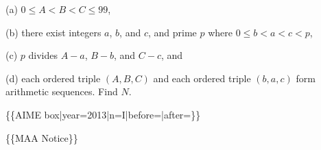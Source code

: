 \documentclass{article}
\begin{document}
\begin{enumerate}[label=\arabic*., itemsep=0.5em]
(a) \(0\le A<B<C\le99\), 

(b) there exist integers \(a\), \(b\), and \(c\), and prime \(p\) where \(0\le b<a<c<p\), 

(c) \(p\) divides \(A-a\), \(B-b\), and \(C-c\), and 

(d) each ordered triple \((A,B,C)\) and each ordered triple \((b,a,c)\) form arithmetic sequences. Find \(N\).



\{\{AIME box|year=2013|n=I|before=|after=\}\}

\{\{MAA Notice\}\}\par \vspace{0.5em}
\end{enumerate}
\end{document}
